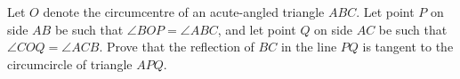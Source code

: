 Let $O$ denote the circumcentre of an acute-angled triangle $ABC$. Let point $P$ on side $AB$ be such that $\angle BOP = \angle ABC$,  and let point $Q$ on side $AC$ be such that $\angle COQ = \angle ACB$. Prove that the reflection of $BC$ in the line $PQ$ is tangent to the circumcircle of triangle $APQ$.